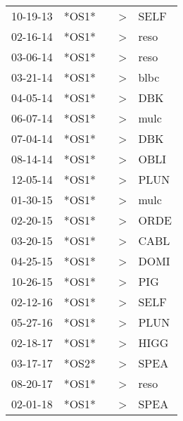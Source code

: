 \begin{supertabular}{p{0.07\textwidth}p{0.06\textwidth}p{0.02\textwidth}p{0.02\textwidth}p{0.06\textwidth}}
 10-19-13\textsuperscript{} &  *OS1* &   &  \textgreater &           SELF\textsuperscript{} \\
 02-16-14\textsuperscript{} &  *OS1* &   &  \textgreater &           reso\textsuperscript{} \\
 03-06-14\textsuperscript{} &  *OS1* &   &  \textgreater &           reso\textsuperscript{} \\
 03-21-14\textsuperscript{} &  *OS1* &   &  \textgreater &           blbc\textsuperscript{} \\
 04-05-14\textsuperscript{} &  *OS1* &   &  \textgreater &            DBK\textsuperscript{} \\
 06-07-14\textsuperscript{} &  *OS1* &   &  \textgreater &           mulc\textsuperscript{} \\
 07-04-14\textsuperscript{} &  *OS1* &   &  \textgreater &            DBK\textsuperscript{} \\
 08-14-14\textsuperscript{} &  *OS1* &   &  \textgreater &           OBLI\textsuperscript{} \\
 12-05-14\textsuperscript{} &  *OS1* &   &  \textgreater &           PLUN\textsuperscript{} \\
 01-30-15\textsuperscript{} &  *OS1* &   &  \textgreater &           mulc\textsuperscript{} \\
 02-20-15\textsuperscript{} &  *OS1* &   &  \textgreater &           ORDE\textsuperscript{} \\
 03-20-15\textsuperscript{} &  *OS1* &   &  \textgreater &           CABL\textsuperscript{} \\
 04-25-15\textsuperscript{} &  *OS1* &   &  \textgreater &           DOMI\textsuperscript{} \\
 10-26-15\textsuperscript{} &  *OS1* &   &  \textgreater &            PIG\textsuperscript{} \\
 02-12-16\textsuperscript{} &  *OS1* &   &  \textgreater &           SELF\textsuperscript{} \\
 05-27-16\textsuperscript{} &  *OS1* &   &  \textgreater &           PLUN\textsuperscript{} \\
 02-18-17\textsuperscript{} &  *OS1* &   &  \textgreater &           HIGG\textsuperscript{} \\
 03-17-17\textsuperscript{} &  *OS2* &   &  \textgreater &           SPEA\textsuperscript{} \\
 08-20-17\textsuperscript{} &  *OS1* &   &  \textgreater &           reso\textsuperscript{} \\
 02-01-18\textsuperscript{} &  *OS1* &   &  \textgreater &           SPEA\textsuperscript{} \\

\end{supertabular}

